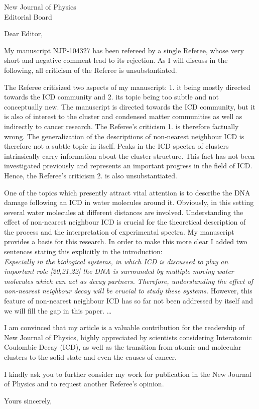 \documentclass[DIN,10pt,pagenumber=false,parskip=half,fromalign=left,fromphone=false,fromemail=true,fromurl=false,fromlogo=true,fromrule=false]{scrlttr2}
\begin{document}
\begin{letter}{New Journal of Physics\\Editorial Board}
\opening{Dear Editor,}

My manuscript NJP-104327 has been refereed by a single Referee, whose very
short and negative comment lead to its rejection. As I will discuss in the
following, all criticism of the Referee is unsubstantiated.

The Referee critisized two aspects of my manuscript: 1. it being mostly directed
towards the ICD community and 2. its topic being too subtle and not conceptually
new.
The manuscript is directed towards the ICD community, but it is also
of interest
to the cluster and condensed matter communities as well as indirectly to cancer
research. The Referee's criticism 1. is therefore factually wrong.
The generalization of the descriptions of non-nearest neighbour
ICD is therefore not a subtle topic in itself. 
Peaks in the ICD spectra of clusters intrinsically carry
information about the cluster structure. This fact has not been investigated
previously and represents an important progress in the field of ICD.
Hence, the Referee's criticism 2. is also unsubstantiated.

One of the topics which presently attract vital attention is
to describe the DNA damage following an ICD in
water molecules around it. Obviously, in this setting several water molecules
at different distances are involved. Understanding the effect of non-nearest
neighbour ICD is crucial for the theoretical description of the process and the
interpretation of experimental spectra. My manuscript provides a basis for
this research. In order to make this more clear I added two sentences
stating this explicitly in the introduction:\\
\emph{Especially in the biological systems, in which ICD is discussed to play an
important role [20,21,22]
the DNA is surrounded by multiple moving
water molecules which can act as decay partners. Therefore, understanding the
effect of non-nearest neighbour decay will be crucial to study these systems.}
However, this feature of non-nearest neighbour ICD
has so far not been addressed by itself and we will fill the gap in this
paper. \dots

I am convinced that my article is a valuable contribution for the
readership of New Journal of Physics, highly appreciated by scientists
considering Interatomic Coulombic Decay (ICD),
as well as the transition from atomic and molecular clusters to the solid state
and even the causes of cancer.

I kindly ask you to further consider my work for publication in the New
Journal of Physics and to request another Referee's opinion.


\closing{Yours sincerely,}
\end{letter}
\end{document}
